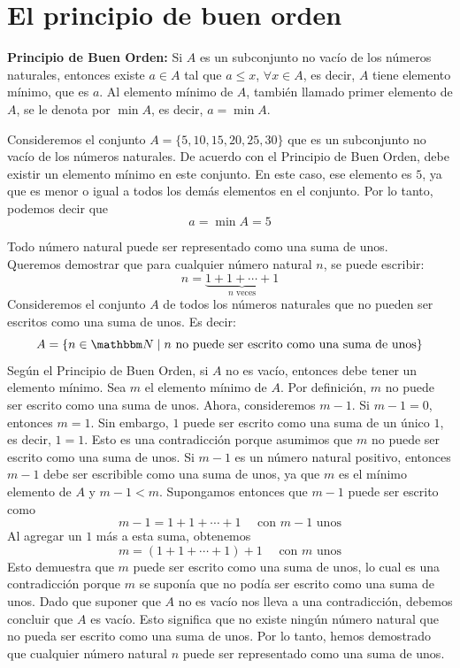 \section{El principio de buen orden}

\noindent\textbf{Principio de Buen Orden:} Si $A$ es un subconjunto no vacío de los números naturales, entonces existe $a \in A$ tal que $a \leq x$, $\forall x \in A$, es decir, $A$ tiene elemento mínimo, que es $a$. Al elemento mínimo de $A$, también llamado primer elemento de $A$, se le denota por $\min A$, es decir, $a = \min A$.

\begin{example}
    Consideremos el conjunto $A = \{5, 10, 15, 20, 25, 30\}$ que es un subconjunto no vacío de los números naturales. De acuerdo con el Principio de Buen Orden, debe existir un elemento mínimo en este conjunto. En este caso, ese elemento es $5$, ya que es menor o igual a todos los demás elementos en el conjunto. Por lo tanto, podemos decir que
    $$a = \min A = 5$$
\end{example}

\begin{example}
    Todo número natural puede ser representado como una suma de unos. \\
    \demostracion Queremos demostrar que para cualquier número natural $n$, se puede escribir:
    $$n = \underbrace{1 + 1 + \cdots + 1}_{n \text{ veces}}$$
    Consideremos el conjunto $A$ de todos los números naturales que no pueden ser escritos como una suma de unos. Es decir:
    $$A = \{ n \in \NN \mid n \text{ no puede ser escrito como una suma de unos} \}$$
    Según el Principio de Buen Orden, si $A$ no es vacío, entonces debe tener un elemento mínimo. Sea $m$ el elemento mínimo de $A$. Por definición, $m$ no puede ser escrito como una suma de unos. Ahora, consideremos $m - 1$. Si $m - 1 = 0$, entonces $m = 1$. Sin embargo, $1$ puede ser escrito como una suma de un único $1$, es decir, $1 = 1$. Esto es una contradicción porque asumimos que $m$ no puede ser escrito como una suma de unos. Si $m - 1$ es un número natural positivo, entonces $m - 1$ debe ser escribible como una suma de unos, ya que $m$ es el mínimo elemento de $A$ y $m - 1 < m$. Supongamos entonces que $m - 1$ puede ser escrito como
    $$m - 1 = 1 + 1 + \cdots + 1 \quad \text{ con } m - 1 \text{ unos}$$
    Al agregar un $1$ más a esta suma, obtenemos
    $$m = (1 + 1 + \cdots + 1) + 1 \quad \text{ con } m \text{ unos}$$
    Esto demuestra que $m$ puede ser escrito como una suma de unos, lo cual es una contradicción porque $m$ se suponía que no podía ser escrito como una suma de unos. Dado que suponer que $A$ no es vacío nos lleva a una contradicción, debemos concluir que $A$ es vacío. Esto significa que no existe ningún número natural que no pueda ser escrito como una suma de unos. Por lo tanto, hemos demostrado que cualquier número natural $n$ puede ser representado como una suma de unos.
\end{example}

